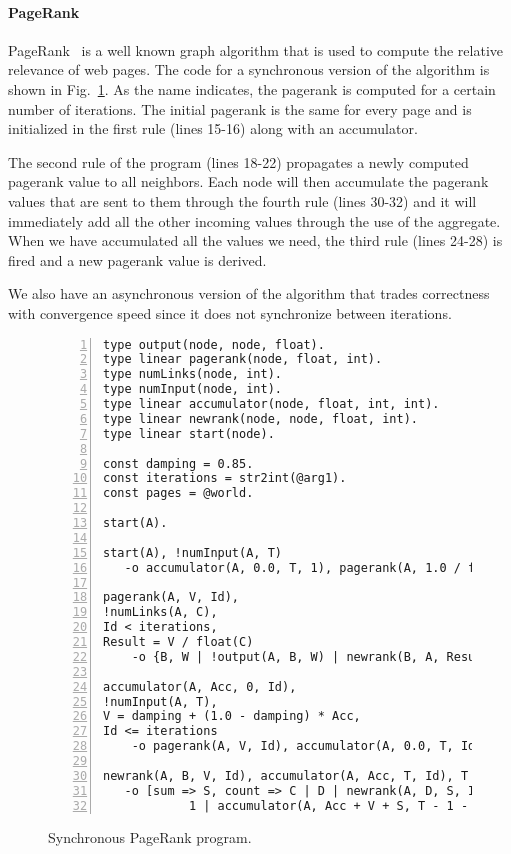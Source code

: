 \paragraph{PageRank}

PageRank~\cite{Page:2001:MNR} is a well known graph algorithm that is used to compute the relative relevance of web pages.
The code for a synchronous version of the algorithm is shown in Fig.~\ref{code:pagerank}.
As the name indicates, the pagerank is computed for a certain number of iterations. The initial pagerank is the same for every page and is
initialized in the first rule (lines 15-16) along with an accumulator.

The second rule of the program (lines 18-22) propagates a newly computed pagerank value to all neighbors. Each node will then accumulate
the pagerank values that are sent to them through the fourth rule (lines 30-32) and it will immediately add all the other incoming values
through the use of the aggregate. When we have accumulated all the values we need, the third rule (lines 24-28) is fired and a new pagerank value is derived.

We also have an asynchronous version of the algorithm that trades correctness with convergence speed since it does not synchronize between iterations.

\begin{figure}[h!]
   \footnotesize\begin{Verbatim}[numbers=left]
type output(node, node, float).
type linear pagerank(node, float, int).
type numLinks(node, int).
type numInput(node, int).
type linear accumulator(node, float, int, int).
type linear newrank(node, node, float, int).
type linear start(node).

const damping = 0.85.
const iterations = str2int(@arg1).
const pages = @world.

start(A).

start(A), !numInput(A, T)
   -o accumulator(A, 0.0, T, 1), pagerank(A, 1.0 / float(pages), 0).

pagerank(A, V, Id),
!numLinks(A, C),
Id < iterations,
Result = V / float(C)
	-o {B, W | !output(A, B, W) | newrank(B, A, Result, Id + 1)}.

accumulator(A, Acc, 0, Id),
!numInput(A, T),
V = damping + (1.0 - damping) * Acc,
Id <= iterations
	-o pagerank(A, V, Id), accumulator(A, 0.0, T, Id + 1).
	
newrank(A, B, V, Id), accumulator(A, Acc, T, Id), T > 0
   -o [sum => S, count => C | D | newrank(A, D, S, Id) |
            1 | accumulator(A, Acc + V + S, T - 1 - C, Id)].
\end{Verbatim}
\caption{Synchronous PageRank program.}
\label{code:pagerank}
\normalsize
\end{figure}

